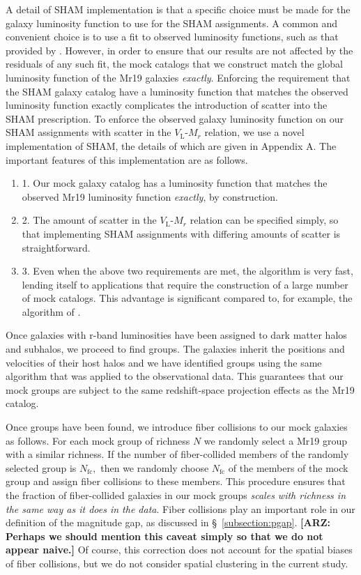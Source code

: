 \documentclass[usenatbib,usegraphicx,letterpaper]{mn2e}
\newcommand{\ben}{\begin{enumerate}}
\newcommand{\een}{\end{enumerate}}
\newcommand{\vl}{V_{\mathrm{L}}}
\begin{document}
A detail of SHAM implementation is that a specific choice must be made 
for the galaxy luminosity function 
to use for the SHAM assignments.  A common and convenient 
choice is to use a fit to observed luminosity functions, 
such as that provided by \citet{blanton_etal05}.  
However, in order to ensure that our results are not affected by 
the residuals of any such fit, the mock catalogs that we 
construct match the global luminosity function of the 
Mr19 galaxies {\em exactly}.  Enforcing the requirement that the SHAM 
galaxy catalog have a luminosity function that matches the 
observed luminosity function exactly complicates the 
introduction of scatter into the SHAM prescription. 
To enforce the observed galaxy luminosity function 
on our SHAM assignments with scatter in the 
$\vl$-$M_r$ relation, we use a novel implementation 
of SHAM, the details of which are given in Appendix A.  
The important features of this implementation are as 
follows.
%
\ben
\item[1.] Our mock galaxy catalog has a luminosity function 
that matches the observed Mr19 luminosity function {\em exactly}, 
by construction.
\item[2.] The amount of scatter in the $\vl$-$M_r$ relation can be specified simply, so that 
implementing SHAM assignments with differing amounts of scatter is straightforward.
\item[3.] Even when the above two requirements are met, the algorithm is very fast, lending itself 
to applications that require the construction of a large number of mock catalogs.  This advantage 
is significant compared to, for example, the algorithm of \citet{trujillo-gomez_etal11}.
\een
%

Once galaxies with r-band luminosities have been assigned to dark matter halos and subhalos, 
we proceed to find groups. The galaxies inherit the positions and velocities of their host 
halos and we have identified groups using the same algorithm that was applied to the observational data. 
This guarantees that our mock groups are subject to the same redshift-space projection effects as 
the Mr19 catalog.

Once groups have been found, we introduce fiber collisions to our mock galaxies as follows. 
For each mock group of richness $N$ we randomly select a Mr19 group with a similar richness. 
If the number of fiber-collided members of the randomly selected group is $N_{\mathrm{fc}},$ 
then we randomly choose $N_{\mathrm{fc}}$ of the members of the mock group and assign fiber 
collisions to these members. This procedure ensures that the fraction of fiber-collided galaxies 
in our mock groups {\em scales with richness in the same way as it does in the data}. Fiber collisions 
play an important role in our definition of the magnitude gap, as discussed in \S~\ref{subsection:pgap}.
{\bf [ARZ: Perhaps we should mention this caveat simply so that we do not appear naive.]} 
Of course, this correction does not account for the spatial biases of fiber collisions, but we 
do not consider spatial clustering in the current study.
\end{document}
